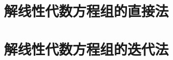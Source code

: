 \setcounter{section}{1}



\section{解线性代数方程组的直接法}


%


%


%


%


%



\section{解线性代数方程组的迭代法}











